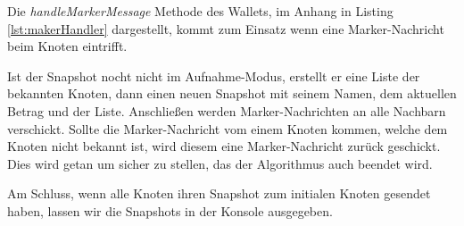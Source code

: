 Die \textit{handleMarkerMessage} Methode des Wallets, im Anhang in Listing 
\ref{lst:makerHandler} dargestellt, kommt zum Einsatz wenn eine Marker-Nachricht
beim Knoten eintrifft.

Ist der Snapshot nocht nicht im Aufnahme-Modus, erstellt er eine Liste der
bekannten Knoten, dann einen neuen Snapshot mit seinem Namen, dem aktuellen
Betrag und der Liste. Anschließen werden Marker-Nachrichten an alle Nachbarn
verschickt.
Sollte die Marker-Nachricht vom einem Knoten kommen, welche dem Knoten nicht
bekannt ist, wird diesem eine Marker-Nachricht zurück geschickt.
Dies wird getan um sicher zu stellen, das der Algorithmus auch beendet wird.

Am Schluss, wenn alle Knoten ihren Snapshot zum initialen Knoten gesendet
haben, lassen wir die Snapshots in der Konsole ausgegeben.
